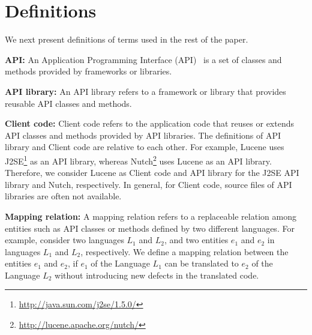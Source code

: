 \section{Definitions}
\label{sec:mapping}

We next present definitions of terms used in the rest of the paper.

\textbf{API:} An Application Programming Interface (API)~\cite{orenstein2000quickstudy}
is a set of classes and methods provided by frameworks or libraries.

\textbf{API library:} An API library refers to a framework
or library that provides reusable API classes and methods.

\textbf{Client code:} Client code refers to the application code
that reuses or extends API classes and methods provided by API
libraries. The definitions of API library and Client code are
relative to each other. For example, Lucene uses
J2SE\footnote{\url{http://java.sun.com/j2se/1.5.0/}} as an API
library, whereas
Nutch\footnote{\url{http://lucene.apache.org/nutch/}} uses Lucene as
an API library. Therefore, we consider Lucene as Client code and API
library for the J2SE API library and Nutch, respectively. In
general, for Client code, source files of API libraries are often
not available.

\textbf{Mapping relation:} A mapping relation refers to a
replaceable relation among entities such as API classes or methods
defined by two different languages. For example, consider two
languages $L_1$ and $L_2$, and two entities $e_1$ and $e_2$ in
languages $L_1$ and $L_2$, respectively. We define a mapping
relation between the entities $e_1$ and $e_2$, if $e_1$ of the
Language $L_1$ can be translated to $e_2$ of the Language $L_2$
without introducing new defects in the translated code.

